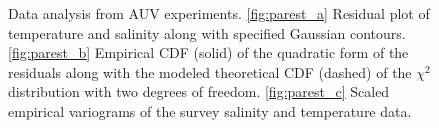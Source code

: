 \documentclass[aoas]{imsart}
\begin{document}
\begin{figure}[!b]
  \centering
  \hfill
  \hfill
  \caption{Data analysis from AUV experiments. \ref{fig:parest_a} Residual plot of temperature and salinity
    along with specified Gaussian contours. \ref{fig:parest_b} Empirical CDF
    (solid) of the quadratic form of the residuals along with the
    modeled theoretical CDF (dashed) of the $\chi^2$ distribution with two
    degrees of freedom. \ref{fig:parest_c} Scaled empirical variograms of the survey
    salinity and temperature data.}
\label{fig:parest}
\end{figure}
\end{document}
